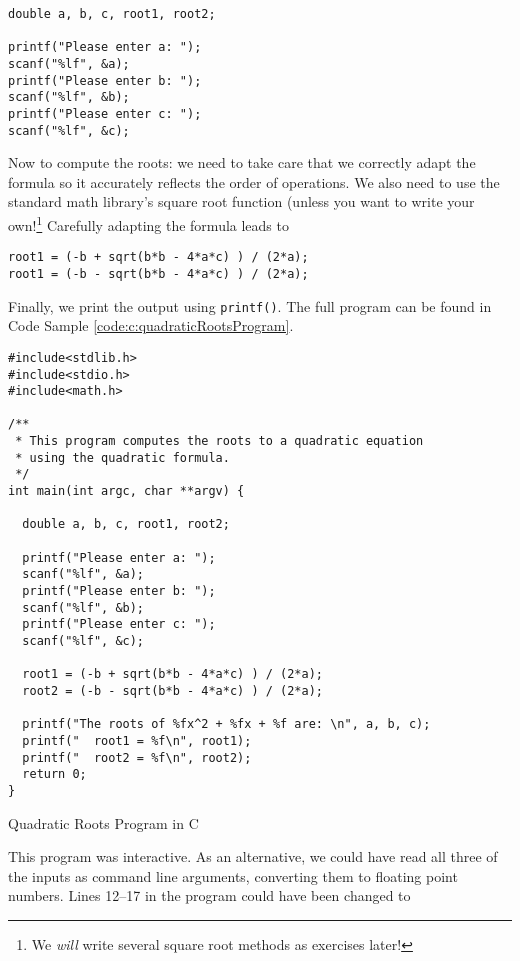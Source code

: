 \begin{verbatim}
double a, b, c, root1, root2;

printf("Please enter a: ");
scanf("%lf", &a);
printf("Please enter b: ");
scanf("%lf", &b);
printf("Please enter c: ");
scanf("%lf", &c);
\end{verbatim}

Now to compute the roots: we need to take care that we correctly adapt the
formula so it accurately reflects the order of operations.  We also need to use
the standard math library's square root function (unless you want to write 
your own!\footnote{We \emph{will} write several square root methods as
exercises later!}  Carefully adapting the formula leads to 

\begin{verbatim}
root1 = (-b + sqrt(b*b - 4*a*c) ) / (2*a);
root1 = (-b - sqrt(b*b - 4*a*c) ) / (2*a);
\end{verbatim}

Finally, we print the output using \texttt{printf()}.  The full program 
can be found in Code Sample \ref{code:c:quadraticRootsProgram}.

\begin{listing}[h]
\begin{verbatim}
#include<stdlib.h>
#include<stdio.h>
#include<math.h>

/**
 * This program computes the roots to a quadratic equation
 * using the quadratic formula.
 */
int main(int argc, char **argv) {

  double a, b, c, root1, root2;

  printf("Please enter a: ");
  scanf("%lf", &a);
  printf("Please enter b: ");
  scanf("%lf", &b);
  printf("Please enter c: ");
  scanf("%lf", &c);
  
  root1 = (-b + sqrt(b*b - 4*a*c) ) / (2*a);
  root2 = (-b - sqrt(b*b - 4*a*c) ) / (2*a);
  
  printf("The roots of %fx^2 + %fx + %f are: \n", a, b, c);
  printf("  root1 = %f\n", root1);
  printf("  root2 = %f\n", root2);
  return 0;
}
\end{verbatim}
\caption{Quadratic Roots Program in C}
\label{code:c:quadraticRootsProgram}
\end{listing}

This program was interactive.  As an alternative, we could have read 
all three of the inputs as command line arguments, converting them 
to floating point numbers.  Lines 12--17 in the
program could have been changed to 

